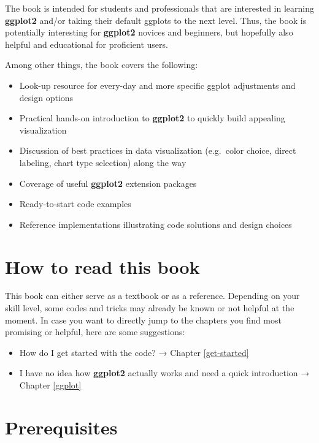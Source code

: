 \documentclass[
]{krantz}
\providecommand{\tightlist}{%
  \setlength{\itemsep}{0pt}\setlength{\parskip}{0pt}}
\begin{document}
The book is intended for students and professionals that are interested in learning \textbf{ggplot2} and/or taking their default ggplots to the next level. Thus, the book is potentially interesting for \textbf{ggplot2} novices and beginners, but hopefully also helpful and educational for proficient users.

Among other things, the book covers the following:

\begin{itemize}
\tightlist
\item
  Look-up resource for every-day and more specific ggplot adjustments and design options
\item
  Practical hands-on introduction to \textbf{ggplot2} to quickly build appealing visualization
\item
  Discussion of best practices in data visualization (e.g.~color choice, direct labeling, chart type selection) along the way
\item
  Coverage of useful \textbf{ggplot2} extension packages
\item
  Ready-to-start code examples
\item
  Reference implementations illustrating code solutions and design choices
\end{itemize}

\hypertarget{how-to-read-this-book}{%
\section*{How to read this book}\label{how-to-read-this-book}}


This book can either serve as a textbook or as a reference. Depending on your skill level, some codes and tricks may already be known or not helpful at the moment. In case you want to directly jump to the chapters you find most promising or helpful, here are some suggestions:

\begin{itemize}
\tightlist
\item
  How do I get started with the code? → Chapter \ref{get-started}
\item
  I have no idea how \textbf{ggplot2} actually works and need a quick introduction → Chapter \ref{ggplot}
\end{itemize}

\hypertarget{prerequisites}{%
\section*{Prerequisites}\label{prerequisites}}
\end{document}
